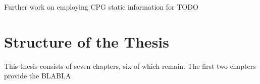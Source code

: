Further work on employing CPG static information for TODO




\section{Structure of the Thesis}

This thesis consists of seven chapters, six of which remain. The first two chapters provide the BLABLA
